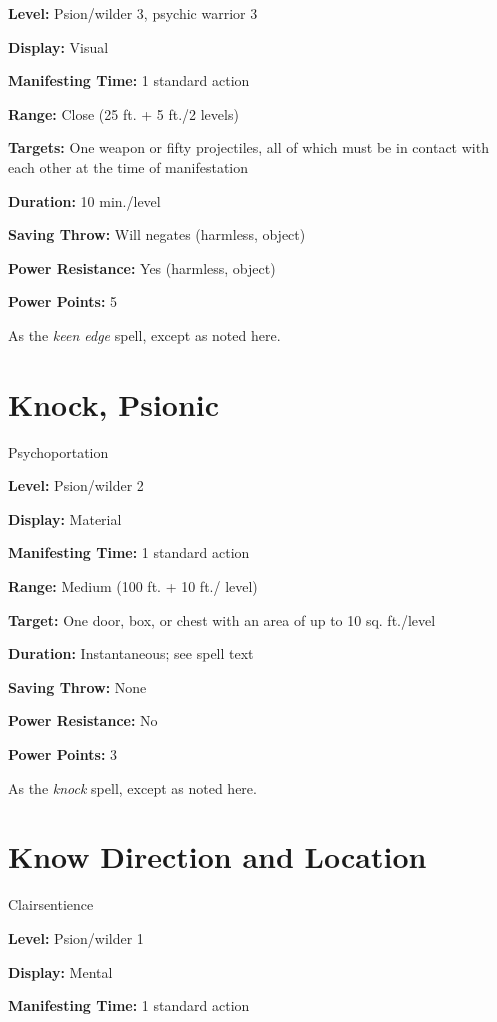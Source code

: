 \documentclass{article}
\begin{document}
\textbf{Level:} Psion/wilder 3, psychic warrior 3

\textbf{Display:} Visual

\textbf{Manifesting Time:} 1 standard action

\textbf{Range:} Close (25 ft. + 5 ft./2 levels)

\textbf{Targets:} One weapon or fifty projectiles, all of which must be in contact 
with each other at the time of manifestation

\textbf{Duration:} 10 min./level

\textbf{Saving Throw:} Will negates (harmless, object)

\textbf{Power Resistance:} Yes (harmless, object)

\textbf{Power Points:} 5

As the \textit{keen edge }spell, except as noted here.

\vspace{12pt}
\section*{Knock, Psionic}

Psychoportation

\textbf{Level:} Psion/wilder 2

\textbf{Display:} Material

\textbf{Manifesting Time:} 1 standard action

\textbf{Range:} Medium (100 ft. + 10 ft./ level)

\textbf{Target:} One door, box, or chest with an area of up to 10 sq. ft./level

\textbf{Duration:} Instantaneous; see spell text

\textbf{Saving Throw:} None

\textbf{Power Resistance:} No

\textbf{Power Points:} 3

As the \textit{knock }spell, except as noted here.

\vspace{12pt}
\section*{Know Direction and Location}

Clairsentience

\textbf{Level:} Psion/wilder 1

\textbf{Display:} Mental

\textbf{Manifesting Time:} 1 standard action
\end{document}
